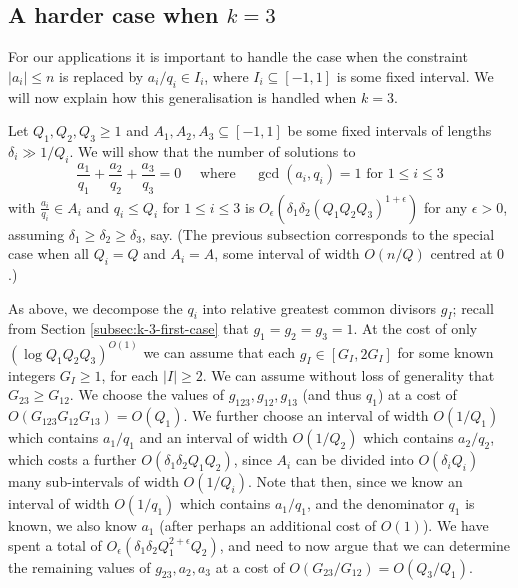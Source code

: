 \documentclass[11pt,letterpaper]{amsart}
\newcommand{\abs}[1]{\left\lvert #1\right\rvert}
\newcommand{\ogcd}[2]{\gcd(#1,#2)}
\theoremstyle{definition}
\begin{document}
\subsection{A harder case when $k=3$}\label{subsec-k3}
For our applications it is important to handle the case when the constraint $\abs{a_i}\leq n$ is replaced by $a_i/q_i\in I_i$, where $I_i\subseteq [-1,1]$ is some fixed interval. We will now explain how this generalisation is handled when $k=3$.

Let $Q_1,Q_2,Q_3\geq 1$ and $A_1,A_2,A_3\subseteq [-1,1]$ be some fixed intervals of lengths $\delta_i\gg 1/Q_i$. We will show that the number of solutions to 
\[\frac{a_1}{q_1}+\frac{a_2}{q_2}+\frac{a_3}{q_3}=0\quad\textrm{ where }\quad\ogcd{a_i}{q_i}=1\textrm{ for }1\leq i\leq 3\]
with $\frac{a_i}{q_i}\in A_i$ and $q_i\leq Q_i$ for $1\leq i\leq 3$ is $O_\epsilon(\delta_1\delta_2(Q_1Q_2Q_3)^{1+\epsilon})$ for any $\epsilon>0$, assuming $\delta_1\geq \delta_2\geq \delta_3$, say. (The previous subsection corresponds to the special case when all $Q_i=Q$ and $A_i=A$, some interval of width $O(n/Q)$ centred at $0$.)

As above, we decompose the $q_i$ into relative greatest common divisors $g_I$; recall from Section \ref{subsec:k-3-first-case} that $g_1 = g_2 = g_3 = 1$. At the cost of only $(\log Q_1Q_2Q_3)^{O(1)}$ we can assume that each $g_I\in [G_I,2G_I]$ for some known integers $G_I\geq 1$, for each $|I| \ge 2$. We can assume without loss of generality that $G_{23}\geq G_{12}$. We choose the values of $g_{123},g_{12},g_{13}$ (and thus $q_1$) at a cost of $O(G_{123}G_{12}G_{13}) = O(Q_1)$. We further choose an interval of width $O(1/Q_1)$ which contains $a_1/q_1$ and an interval of width $O(1/Q_2)$ which contains $a_2/q_2$, which costs a further $O(\delta_1\delta_2Q_1Q_2)$, since $A_i$ can be divided into $O(\delta_i Q_i)$ many sub-intervals of width $O(1/Q_i)$. Note that then, since we know an interval of width $O(1/q_1)$ which contains $a_1/q_1$, and the denominator $q_1$ is known, we also know $a_1$ (after perhaps an additional cost of $O(1)$). We have spent a total of $O_\epsilon(\delta_1\delta_2Q_1^{2+\epsilon}Q_2)$, and need to now argue that we can determine the remaining values of $g_{23},a_2,a_3$ at a cost of $O(G_{23}/G_{12})=O(Q_3/Q_1)$.
\end{document}
